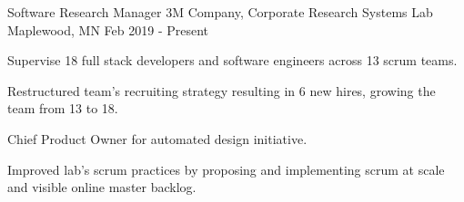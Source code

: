 

\begin{cventries}

  \cventry
    {Software Research Manager} %
    {3M Company, Corporate Research Systems Lab} %
    {Maplewood, MN} %
    {Feb 2019 - Present} %
    {
      \begin{cvitems} %
      \item {Supervise 18 full stack developers and software engineers across 13 scrum
          teams.}
       \item {Restructured team's recruiting strategy resulting in 6 new hires, growing
           the team from 13 to 18.}
       \item {Chief Product Owner for automated design initiative.}
       \item {Improved lab's scrum practices by proposing and implementing scrum at scale
           and visible online master backlog.}
      \end{cvitems}
    }


\end{cventries}
